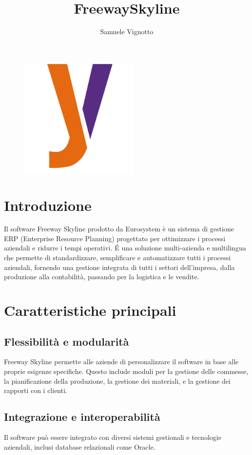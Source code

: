 \documentclass{article}
\title{\Huge{\textbf{FreewaySkyline}}\vspace{-1em}}
\author{Samuele Vignotto}
\date{}
\begin{document}
\maketitle
\begin{figure}[h]
  \centering
  \includegraphics[width=6cm, height=6cm]{Logo/Y_LOGO-SOLO.png}
  \label{fig:immagine}
\end{figure}

\newpage
\tableofcontents
\newpage

\section{Introduzione}
Il software Freeway Skyline prodotto da Eurosystem è un sistema di gestione ERP (Enterprise Resource Planning) progettato per ottimizzare i processi aziendali e ridurre i tempi operativi. É una soluzione multi-azienda e multilingua che permette di standardizzare, semplificare e automatizzare tutti i processi aziendali, fornendo una gestione integrata di tutti i settori dell'impresa, dalla produzione alla contabilità, passando per la logistica e le vendite.

\section{Caratteristiche principali}
\subsection{Flessibilità e modularità}
Freeway Skyline permette alle aziende di personalizzare il software in base alle proprie esigenze specifiche. Questo include moduli per la gestione delle commesse, la pianificazione della produzione, la gestione dei materiali, e la gestione dei rapporti con i clienti.
\subsection{Integrazione e interoperabilità}
Il software può essere integrato con diversi sistemi gestionali e tecnologie aziendali, inclusi database relazionali come Oracle.
\end{document}
